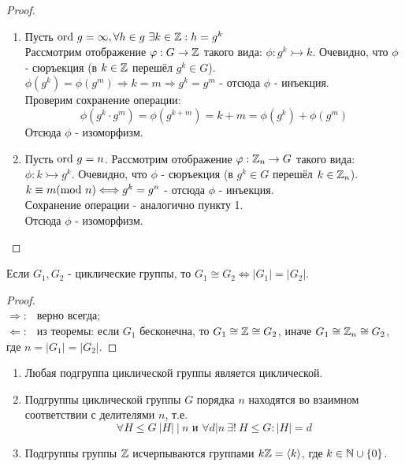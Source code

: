 \begin{proof}\tab
    \begin{enumerate}
        \item Пусть $\textup{ord } g = \infty, \forall h \in g \ \exists k \in \mathbb{Z}: h = g^k$\\
        Рассмотрим отображение $\varphi: G \rightarrow \mathbb{Z}$ такого вида: $\phi: g^k \rightarrowtail k$. Очевидно, что $\phi$ - сюръекция (в $k\in \mathbb{Z}$ перешёл $g^k \in G$).\\
        $\phi(g^k) = \phi(g^m) \Longrightarrow k = m \Longrightarrow g^k = g^m$ - отсюда $\phi$ - инъекция.\\
        Проверим сохранение операции:
        \[\phi(g^k \cdot g^m) = \phi(g^{k+m}) = k+m = \phi(g^k) + \phi(g^m)\]
        Отсюда $\phi$ - изоморфизм.
        \item Пусть $\textup{ord } g = n$. Рассмотрим отображение $\varphi: \mathbb{Z}_n \rightarrow G$ такого вида: $\phi: k \rightarrowtail g^k$. Очевидно, что $\phi$ - сюръекция (в $g^k\in G$ перешёл $k \in \mathbb{Z}_n$).\\
        $k \equiv m (\textup{mod } n) \Longleftrightarrow g^k = g^n$ - отсюда $\phi$ - инъекция.\\
        Сохранение операции - аналогично пункту 1.\\ 
        Отсюда $\phi$ - изоморфизм.
    \end{enumerate}
\end{proof}
\begin{consequense}
    Если $G_1, G_2$ - циклические группы, то $G_1 \cong G_2 \Longleftrightarrow |G_1| = |G_2|$.
\end{consequense}
\begin{proof} \tab\\
    $\Longrightarrow : \ \ $ верно всегда;\\
    $\Longleftarrow : \ \ $ из теоремы: если $G_1$ бесконечна, то $G_1 \cong \mathbb{Z} \cong G_2$, иначе $G_1 \cong \mathbb{Z}_n \cong G_2$, где $n = |G_1| = |G_2|$.
\end{proof}
\begin{theoremnum} \tab
    \begin{enumerate}
        \item Любая подгруппа циклической группы является циклической.
        \item Подгруппы циклической группы $G$ порядка $n$ находятся во взаимном соответствии с делителями $n$, т.е.
        \[\forall H \leqslant G \ |H| \ |\  n \text{ и } \forall d | n \ \exists! \ H \leqslant G : |H| = d\]
        \item Подгруппы группы $\mathbb{Z}$ исчерпываются группами $k\mathbb{Z} =  \langle k \rangle$, где $k \in \mathbb{N} \cup \{0\}$.
    \end{enumerate}
\end{theoremnum}
